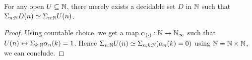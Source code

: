 \begin{lemma}\label{OpenInNAreDecidableInN}
For any open $U\subseteq \mathbb{N}$, there merely exists a decidable set $D$ in $\mathbb{N}$ such that 
$\Sigma_{n:\mathbb{N}} D(n) \simeq \Sigma_{n:\mathbb{N}} U(n)$.
\end{lemma}
\begin{proof}
  Using countable choice, we get a map $\alpha_{(\cdot)}: \mathbb{N} \to \mathbb{N}_{\infty}$ such that 
  $U(n) \leftrightarrow \Sigma_{k:\mathbb{N}} \alpha_n(k) = 1$. Hence 
  $\Sigma_{n:\mathbb{N}}U(n) \simeq \Sigma_{n,k:\mathbb{N}}(\alpha_n(k)=0)$
  using $\mathbb{N}=\mathbb{N}\times\mathbb{N}$, we can conclude. 
\end{proof}

